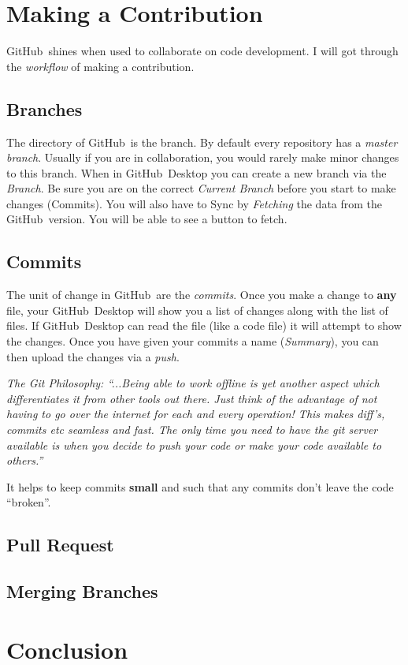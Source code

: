 \documentclass{article}
\newcommand{\gh}{GitHub~}
\begin{document}
\section{Making a Contribution}

\gh shines when used to collaborate on code development. I will got through the \textit{workflow} of making a contribution.

\subsection{Branches}

The directory of \gh is the branch. By default every repository has a \textit{master branch}. Usually if you are in collaboration, you would rarely make minor changes to this branch. When in \gh Desktop you can create a new branch via the \textit{Branch}. Be sure you are on the correct \textit{Current Branch} before you start to make changes (Commits). You will also have to Sync by \textit{Fetching} the data from the \gh version. You will be able to see a button to fetch.

\subsection{Commits}

The unit of change in \gh are the \textit{commits}. Once you make a change to \textbf{any} file, your \gh Desktop will show you a list of changes along with the list of files. If \gh Desktop can read the file (like a code file) it will attempt to show the changes. Once you have given your commits a name (\textit{Summary}), you can then upload the changes via a \textit{push}.

\textit{The Git Philosophy: ``...Being able to work offline is yet another aspect which differentiates it from other tools out there. Just think of the advantage of not having to go over the internet for each and every operation! This makes diff’s, commits etc seamless and fast. The only time you need to have the git server available is when you decide to push your code or make your code available to others.''}

It helps to keep commits \textbf{small} and such that any commits don't leave the code ``broken''.

\subsection{Pull Request}

\subsection{Merging Branches}

\section{Conclusion}
\end{document}
